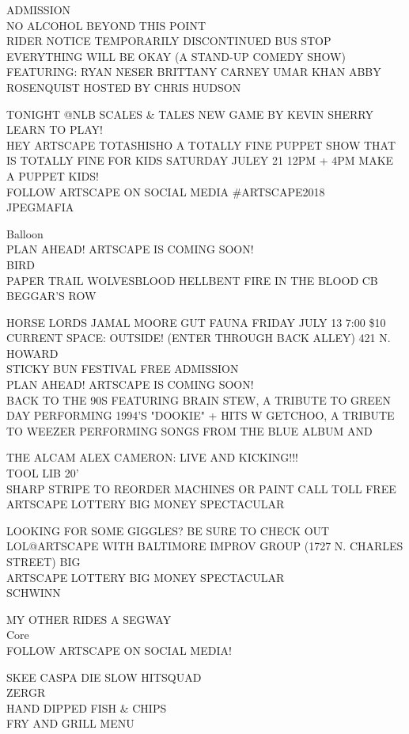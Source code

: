 \documentclass[10pt,letterpaper]{article}
\begin{document}
ADMISSION\\
NO ALCOHOL BEYOND THIS POINT\\
RIDER NOTICE TEMPORARILY DISCONTINUED BUS STOP\\
EVERYTHING WILL BE OKAY (A STAND{-}UP COMEDY SHOW) FEATURING: RYAN NESER BRITTANY CARNEY UMAR KHAN ABBY ROSENQUIST HOSTED BY CHRIS HUDSON

TONIGHT @NLB SCALES \& TALES NEW GAME BY KEVIN SHERRY LEARN TO PLAY!\\
HEY ARTSCAPE TOTASHISHO A TOTALLY FINE PUPPET SHOW THAT IS TOTALLY FINE FOR KIDS SATURDAY JULEY 21 12PM + 4PM MAKE A PUPPET KIDS!\\
FOLLOW ARTSCAPE ON SOCIAL MEDIA \#ARTSCAPE2018\\
JPEGMAFIA

Balloon\\
PLAN AHEAD!  ARTSCAPE IS COMING SOON!\\
BIRD\\
PAPER TRAIL WOLVESBLOOD HELLBENT FIRE IN THE BLOOD CB BEGGAR'S ROW

HORSE LORDS JAMAL MOORE GUT FAUNA FRIDAY JULY 13 7:00 \$10 CURRENT SPACE: OUTSIDE! (ENTER THROUGH BACK ALLEY) 421 N. HOWARD\\
STICKY BUN FESTIVAL FREE ADMISSION\\
PLAN AHEAD!  ARTSCAPE IS COMING SOON!\\
BACK TO THE 90S FEATURING BRAIN STEW, A TRIBUTE TO GREEN DAY PERFORMING 1994'S "DOOKIE" + HITS W GETCHOO, A TRIBUTE TO WEEZER PERFORMING SONGS FROM THE BLUE ALBUM AND

THE ALCAM ALEX CAMERON: LIVE AND KICKING!!!\\
TOOL LIB 20'\\
SHARP STRIPE TO REORDER MACHINES OR PAINT CALL TOLL FREE\\
ARTSCAPE LOTTERY BIG MONEY SPECTACULAR

LOOKING FOR SOME GIGGLES?  BE SURE TO CHECK OUT LOL@ARTSCAPE WITH BALTIMORE IMPROV GROUP (1727 N. CHARLES STREET) BIG\\
ARTSCAPE LOTTERY BIG MONEY SPECTACULAR\\
SCHWINN

MY OTHER RIDES A SEGWAY\\
Core\\
FOLLOW ARTSCAPE ON SOCIAL MEDIA!

SKEE CASPA DIE SLOW HITSQUAD\\
ZERGR\\
HAND DIPPED FISH \& CHIPS\\
FRY AND GRILL MENU
\end{document}

